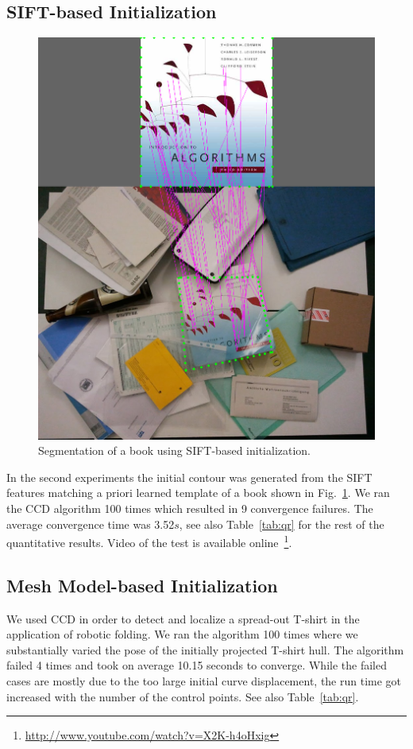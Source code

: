\documentclass[conference]{IEEEtran}
\begin{document}
\subsection{SIFT-based Initialization}
\label{sec:sift_init}
\begin{figure}[htbp]
  \centering
  \includegraphics[width=0.8\columnwidth]{book/sift_result.png}
  \caption{Segmentation of a book using SIFT-based initialization.}
  \label{fig:sift_result}
\end{figure}

In the second experiments  the initial contour was generated from the SIFT features 
matching a priori learned template of a book shown in Fig.~\ref{fig:sift_result}. 
We ran the CCD algorithm 100 times which resulted in 9 convergence failures. 
The average convergence time was 3.52$s$, see also Table~\ref{tab:qr} for the rest
of the quantitative results. Video of the test is available online~\footnote{\url{http://www.youtube.com/watch?v=X2K-h4oHxig}}.

\subsection{Mesh Model-based Initialization}
\label{sec:tifpc}
We used CCD in order to detect and localize a spread-out T-shirt in the application
of robotic folding. We ran the algorithm 100 times where we substantially varied
the pose of the initially projected T-shirt hull. The algorithm failed 4 times and took
on average 10.15 seconds to converge. While the failed cases are mostly due to the 
too large initial curve displacement, the run time got increased with the number of 
the control points. See also Table~\ref{tab:qr}.
\end{document}
